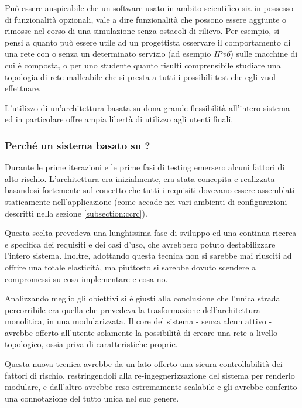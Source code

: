Può essere auspicabile che un software usato in ambito scientifico sia in possesso di funzionalità opzionali, vale a dire funzionalità che possono essere aggiunte o rimosse nel corso di una simulazione senza ostacoli di rilievo. Per esempio, si pensi a quanto può essere utile ad un progettista osservare il comportamento di una rete con o senza un determinato servizio (ad esempio \emph{IPv6}) sulle macchine di cui è composta, o per uno studente quanto risulti comprensibile studiare una topologia di rete malleabile che si presta a tutti i possibili test che egli vuol effettuare.

L'utilizzo di un'architettura basata su \plugin{} dona grande flessibilità all'intero sistema ed in particolare offre ampia libertà di utilizzo agli utenti finali.

\subsubsection{Perché un sistema basato su \plugin{}?}
Durante le prime iterazioni e le prime fasi di testing emersero alcuni fattori di alto rischio. L'architettura era inizialmente, era stata concepita e realizzata basandosi fortemente sul concetto che tutti i requisiti dovevano essere assemblati staticamente nell'applicazione (come accade nei vari ambienti di configurazioni descritti nella sezione \ref{subsection:ccrc}).

Questa scelta prevedeva una lunghissima fase di sviluppo ed una continua ricerca e specifica dei requisiti e dei casi d'uso, che avrebbero potuto destabilizzare l'intero sistema. Inoltre, adottando questa tecnica non si sarebbe mai riusciti ad offrire una totale elasticità, ma piuttosto si sarebbe dovuto scendere a compromessi su cosa implementare e cosa no.

Analizzando meglio gli obiettivi si è giusti alla conclusione che l'unica strada percorribile era quella che prevedeva la trasformazione dell'architettura monolitica, in una modularizzata. Il core del sistema - senza alcun \plugin{} attivo - avrebbe offerto all'utente solamente la possibilità di creare una rete a livello topologico, ossia priva di caratteristiche proprie.

Questa nuova tecnica avrebbe da un lato offerto una sicura controllabilità dei fattori di rischio, restringendoli alla re-ingegnerizzazione del sistema per renderlo modulare, e dall'altro avrebbe reso \visualnetkit{} estremamente scalabile e gli avrebbe conferito una connotazione del tutto unica nel suo genere.

